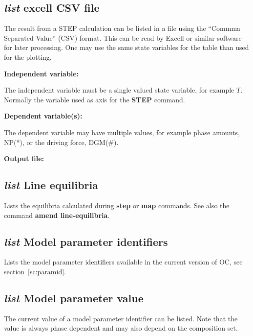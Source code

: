 \documentclass[11pt]{article}
\begin{document}
\subsection{{\em list} excell CSV file}

The result from a STEP calculation can be listed in a file using the
``Commma Separated Value'' (CSV) format.  This can be read by Excell or
similar software for later processing.  One may use the same state
variables for the table than used for the plotting.

{\bf Independent variable:}

The independent variable must be a single valued state variable, for
example $T$.  Normally the variable used as axis for the {\bf STEP}
command.

{\bf Dependent variable(s):}

The dependent variable may have multiple values, for example phase
amounts, NP(*), or the driving force, DGM(\#).

{\bf Output file:}

\hypertarget{List line-equilibria}{}
\subsection{{\em list} Line equilibria}

Lists the equilibria calculated during {\bf step} or {\bf map}
commands.  See also the command {\bf amend line-equilibria}.


\hypertarget{List model parameter id}{}
\subsection{{\em list} Model parameter identifiers}

Lists the model parameter identifiers available in the current version
of OC, see section~\ref{sc:paramid}.

\hypertarget{List model parameter val}{}
\subsection{{\em list} Model parameter value}

The current value of a model parameter identifier can be listed.  Note
that the value is always phase dependent and may also depend on the
composition set.

\hypertarget{List Optimization}{}
\end{document}

